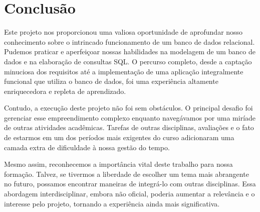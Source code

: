 \chapter{Conclusão}

Este projeto nos proporcionou uma valiosa oportunidade de aprofundar nosso conhecimento sobre o intrincado funcionamento de um banco de dados relacional. Pudemos praticar e aperfeiçoar nossas habilidades na modelagem de um banco de dados e na elaboração de consultas SQL. O percurso completo, desde a captação minuciosa dos requisitos até a implementação de uma aplicação integralmente funcional que utiliza o banco de dados, foi uma experiência altamente enriquecedora e repleta de aprendizado.

Contudo, a execução deste projeto não foi sem obstáculos. O principal desafio foi gerenciar esse empreendimento complexo enquanto navegávamos por uma miríade de outras atividades acadêmicas. Tarefas de outras disciplinas, avaliações e o fato de estarmos em um dos períodos mais exigentes do curso adicionaram uma camada extra de dificuldade à nossa gestão do tempo.

Mesmo assim, reconhecemos a importância vital deste trabalho para nossa formação. Talvez, se tivermos a liberdade de escolher um tema mais abrangente no futuro, possamos encontrar maneiras de integrá-lo com outras disciplinas. Essa abordagem interdisciplinar, embora não oficial, poderia aumentar a relevância e o interesse pelo projeto, tornando a experiência ainda mais significativa.

